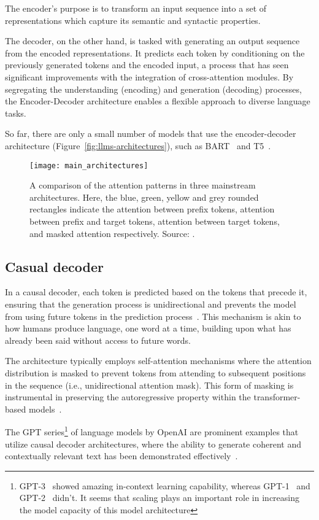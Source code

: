 The encoder's purpose is to transform an input sequence into a set of representations which capture its semantic and syntactic properties.

The decoder, on the other hand, is tasked with generating an output sequence from the encoded representations.
It predicts each token by conditioning on the previously generated tokens and the encoded input, a process that has seen significant improvements with the integration of cross-attention modules.
By segregating the understanding (encoding) and generation (decoding) processes, the Encoder-Decoder architecture enables a flexible approach to diverse language tasks.

So far, there are only a small number of models that use the encoder-decoder architecture (Figure~\ref{fig:llms-architectures}), such as BART~\cite{lewis2020bart} and T5~\cite{raffel2023exploring}.

\begin{figure}[h]
	\centering
	\texttt{[image: main\_architectures]}
	\caption{A comparison of the attention patterns in three mainstream architectures. Here, the blue, green, yellow and grey rounded rectangles indicate the attention between prefix tokens, attention between prefix and target tokens, attention between target tokens, and masked attention respectively. Source: \textcite{survey}.}
	\label{fig:architectures}
\end{figure}

\subsection{Casual decoder}
\label{subsec:casual-decoder}

In a causal decoder, each token is predicted based on the tokens that precede it, ensuring that the generation process is unidirectional and prevents the model from using future tokens in the prediction process~\cite{vaswani2023attention}.
This mechanism is akin to how humans produce language, one word at a time, building upon what has already been said without access to future words.

The architecture typically employs self-attention mechanisms where the attention distribution is masked to prevent tokens from attending to subsequent positions in the sequence (i.e., unidirectional attention mask).
This form of masking is instrumental in preserving the autoregressive property within the transformer-based models~\cite{radford2019language}.

The GPT series\footnote{GPT-3~\cite{brown2020language} showed amazing in-context learning capability, whereas GPT-1~\cite{radford2018improving} and GPT-2~\cite{radford2019language} didn't. It seems that scaling plays an important role in increasing the model capacity of this model architecture} of language models by OpenAI are prominent examples that utilize causal decoder architectures, where the ability to generate coherent and contextually relevant text has been demonstrated effectively~\cite{brown2020language}.

